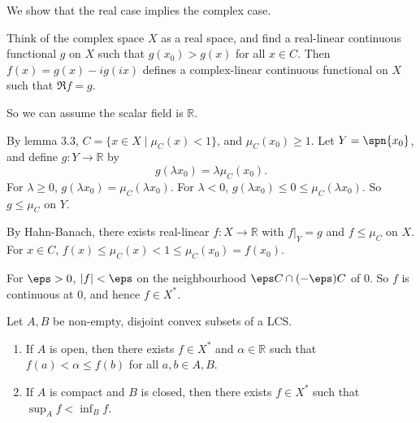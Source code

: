 \documentclass[12pt]{article}
\begin{document}
\begin{proofbox}
	We show that the real case implies the complex case.

	Think of the complex space $X$ as a real space, and find a real-linear continuous functional $g$ on $X$ such that $g(x_0) > g(x)$ for all $x \in C$. Then $f(x) = g(x) - i g(ix)$ defines a complex-linear continuous functional on $X$ such that $\Re f = g$.

	So we can assume the scalar field is $\mathbb{R}$.

	By lemma 3.3, $C = \{x \in X \mid \mu_C(x) < 1\}$, and $\mu_C(x_0) \geq 1$. Let $Y = \spn \{x_0\}$, and define $g : Y \to \mathbb{R}$ by
	\[
	g(\lambda x_0) = \lambda \mu_C(x_0).
	\]
	For $\lambda \geq 0$, $g(\lambda x_0) = \mu_C(\lambda x_0)$. For $\lambda < 0$, $g( \lambda x_0) \leq 0 \leq \mu_C (\lambda x_0)$. So $g \leq \mu_C$ on $Y$.

	By Hahn-Banach, there exists real-linear $f : X \to \mathbb{R}$ with $f|_Y = g$ and $f \leq \mu_C$ on $X$. For $x \in C$, $f(x) \leq \mu_C(x) < 1 \leq \mu_C(x_0) = f(x_0)$.

	For $\eps > 0$, $|f| < \eps$ on the neighbourhood $\eps C \cap (-\eps) C$ of $0$. So $f$ is continuous at $0$, and hence $f \in X^{\ast}$.
\end{proofbox}

\begin{theorem}
	Let $A, B$ be non-empty, disjoint convex subsets of a LCS.
	\begin{enumerate}[\normalfont(i)]
		\item If $A$ is open, then there exists $f \in X^{\ast}$ and $\alpha \in \mathbb{R}$ such that $f(a) < \alpha \leq f(b)$ for all $a, b \in A, B$.
		\item If $A$ is compact and $B$ is closed, then there exists $f \in X^{\ast}$ such that $\sup_A f < \inf_B f$.
	\end{enumerate}
\end{theorem}
\end{document}
